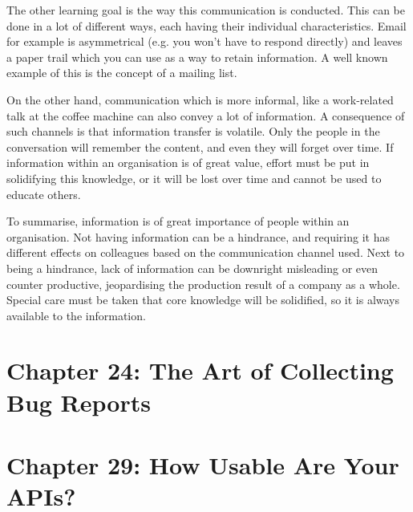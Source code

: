 \documentclass[]{uva-bachelor-thesis}
\def \CurrChapter {}
\def \CurrSection {}
\renewcommand{\chaptermark}[1]{\def \CurrChapter {#1} \def \CurrSection {}}
\begin{document}
The other learning goal is the way this communication is conducted.
This can be done in a lot of different ways, each having their individual characteristics. 
Email for example is asymmetrical (e.g. you won't have to respond directly) and leaves a paper trail which you can use as a way to retain information. 
A well known example of this is the concept of a mailing list. 

On the other hand, communication which is more informal, like a work-related talk at the coffee machine can also convey a lot of information. 
A consequence of such channels is that information transfer is volatile. 
Only the people in the conversation will remember the content, and even they will forget over time. 
If information within an organisation is of great value, effort must be put in solidifying this knowledge, or it will be lost over time and cannot be used to educate others. 

To summarise, information is of great importance of people within an organisation. 
Not having information can be a hindrance, and requiring it has different effects on colleagues based on the communication channel used. 
Next to being a hindrance, lack of information can be downright misleading or even counter productive, jeopardising the production result of a company as a whole.
Special care must be taken that core knowledge will be solidified, so it is always available to the information. 

\chapter{Chapter 24: The Art of Collecting Bug Reports \cite{makingsoftware}}

\chapter{Chapter 29: How Usable Are Your APIs? \cite{makingsoftware}}



\chaptermark{Bibliography}
\end{document}
